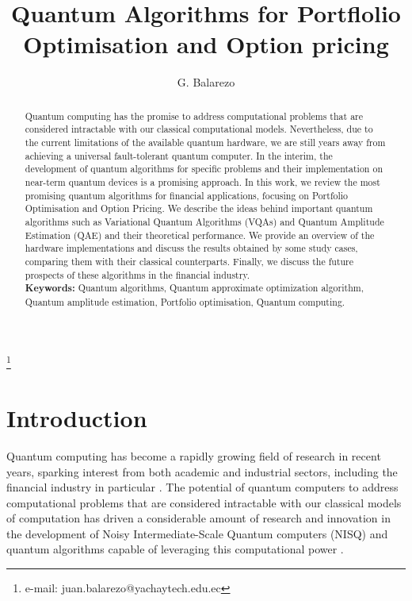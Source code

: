 \documentclass[prx,twocolumn,floatfix,superscriptaddress,longbibliography]{revtex4-1}
\begin{document}
\title{Quantum Algorithms for Portflolio Optimisation and Option pricing}

\author{G. Balarezo}
\thanks{e-mail: juan.balarezo@yachaytech.edu.ec}


\begin{abstract}
Quantum computing has the promise to address computational problems that are considered intractable with our classical computational models. Nevertheless, due to the current limitations of the available quantum hardware, we are still years away from achieving a universal fault-tolerant quantum computer. In the interim, the development of quantum algorithms for specific problems and their implementation on near-term quantum devices is a promising approach. In this work, we review the most promising quantum algorithms for financial applications, focusing on Portfolio Optimisation and Option Pricing. We describe the ideas behind important quantum algorithms such as Variational Quantum Algorithms (VQAs) and Quantum Amplitude Estimation (QAE) and their theoretical performance. We provide an overview of the hardware  implementations and discuss the results 
obtained by some study cases, comparing them with their classical counterparts. Finally, we discuss the future prospects of these algorithms in the financial industry.
  \\
  \textbf{Keywords:} Quantum algorithms, Quantum approximate optimization algorithm, Quantum amplitude estimation, Portfolio optimisation, Quantum computing.
\end{abstract}

\maketitle

\section{Introduction}

Quantum computing has become a rapidly growing field of research in recent years, sparking interest from both academic and industrial sectors, including the financial industry in particular \cite{Hassija2020}. The potential of quantum computers to address computational problems that are considered intractable with our classical models of computation \cite{nielsen2010quantum} has driven a considerable amount of research and innovation in the development of Noisy Intermediate-Scale Quantum computers (NISQ) and quantum algorithms capable of leveraging this computational power \cite{Huang2023}. 
\end{document}
